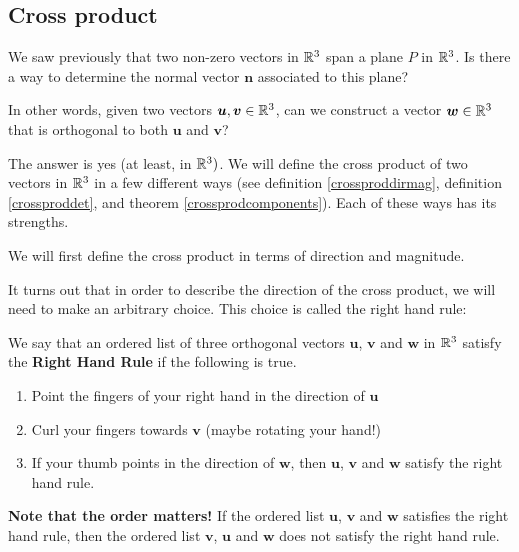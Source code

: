 \subsection{Cross product}

We saw previously that two non-zero vectors in $\mathbb{R}^3$ span a plane $P$ in $\mathbb{R}^3$.  Is there a way to determine the normal vector $\bm{n}$ associated to this plane?

\begin{motivating}

In other words, given two vectors $\bm{u}, \bm{v} \in \mathbb{R}^3$, can we construct a vector $\bm{w} \in \mathbb{R}^3$ that is orthogonal to both $\bm{u}$ and $\bm{v}$?
\end{motivating} 

The answer is yes (at least, in $\mathbb{R}^3)$. We will define the cross product of two vectors in $\mathbb{R}^3$ in a few different ways (see definition \ref{crossproddirmag}, definition \ref{crossproddet}, and theorem \ref{crossprodcomponents}).  Each of these ways has its strengths.

We will first define the cross product in terms of direction and magnitude.

It turns out that in order to describe the direction of the cross product, we will need to make an arbitrary choice. This choice is called the right hand rule: 

\begin{definition}
    We say that an ordered list of three orthogonal vectors $\bm{u}$, $\bm{v}$ and $\bm{w}$ in $\mathbb{R}^3$ satisfy the \textbf{Right Hand Rule} if the following is true.
    
    \begin{enumerate}
        \item Point the fingers of your right hand in the direction of $\bm{u}$
        \item Curl your fingers towards $\bm{v}$ (maybe rotating your hand!)
        \item If your thumb points in the direction of $\bm{w}$, then $\bm{u}$, $\bm{v}$ and $\bm{w}$ satisfy the right hand rule.
    \end{enumerate}
    
    \end{definition}

\textbf{Note that the order matters!} If the ordered list $\bm{u}$, $\bm{v}$ and $\bm{w}$ satisfies the right hand rule, then the ordered list $\bm{v}$, $\bm{u}$ and $\bm{w}$ does not satisfy the right hand rule.

